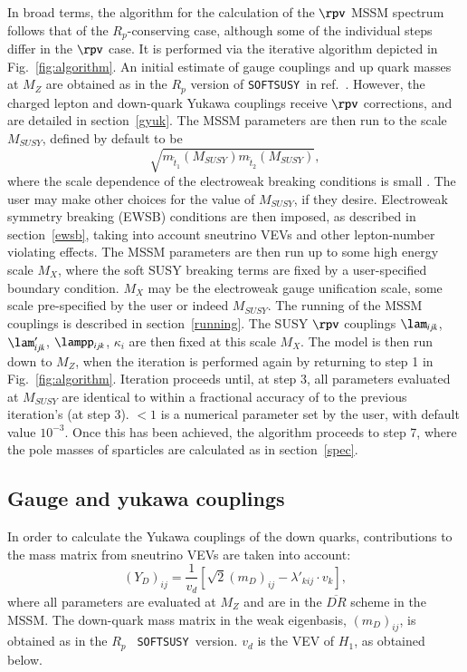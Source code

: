 \documentclass[final,3p,times,pdflatex]{elsarticle}
\begin{document}
In broad terms, the algorithm for the calculation of the $\rpv$ MSSM spectrum
follows that of the $R_p$-conserving case,  although some of the
individual steps differ in the $\rpv$ case. It is performed via the iterative
algorithm depicted in Fig.~\ref{fig:algorithm}.
An initial estimate of
gauge couplings and up quark masses at $M_Z$ are obtained as
in the $R_p$ version of {\tt SOFTSUSY}~in ref.~\cite{Allanach:2001kg}. 
However, the charged lepton and down-quark Yukawa couplings receive $\rpv$
corrections, and are detailed in section~\ref{gyuk}. The MSSM parameters are
then run to the scale $M_{SUSY}$, defined by default to be 
\begin{equation}
\sqrt{m_{\tilde t_1}(M_{SUSY}) m_{\tilde
    t_2}(M_{SUSY})}, \label{msusy} 
\end{equation}
where the scale dependence of the electroweak breaking conditions is
small \cite{Casas:1998cf}. The user may make other choices for the value of
$M_{SUSY}$, if they desire.
Electroweak symmetry breaking (EWSB) conditions are
then imposed, as described in section~\ref{ewsb}, taking into account
sneutrino VEVs and other lepton-number violating effects. The MSSM parameters
are then run up to some high energy scale $M_X$, where the soft SUSY breaking
terms are fixed by a user-specified boundary condition. $M_X$ may be the
electroweak gauge unification scale, some scale pre-specified by the user or
indeed $M_{SUSY}$. The running of the MSSM couplings is described in
section~\ref{running}. 
The SUSY $\rpv$ couplings $\lam_{ijk}$, $\lam'_{ijk}$,
$\lampp_{ijk}$, $\kappa_i$ are then fixed at this scale $M_X$.
The model is then run down to $M_Z$, when the iteration is performed again by
returning to step 1 in Fig.~\ref{fig:algorithm}. Iteration proceeds until, at
step 3, all parameters evaluated at $M_{SUSY}$ are identical to within a fractional
accuracy of  to the previous iteration's (at step 3). 
$<1$ is a numerical parameter set by the user, with default
value $10^{-3}$. 
Once this has been
achieved, the algorithm proceeds to step 7, where the pole masses of
sparticles are calculated as in section~\ref{spec}.

\subsection{Gauge and yukawa couplings \label{gyuk}}

In order to calculate the Yukawa couplings of the down quarks, contributions
to the mass matrix from sneutrino VEVs are taken into 
account:
\begin{equation}
(Y_{D})_{ij} = \frac{1}{v_d}\left[\sqrt{2}(m_D)_{ij} -\lambda'_{kij}\cdot
   {v_k}\right], 
\end{equation}
where all parameters are evaluated at $M_Z$ and are in the $\overline{DR}$
scheme in the MSSM\@. The down-quark mass matrix in the weak eigenbasis,
$(m_D)_{ij}$, is obtained as in the $R_p$ {\tt 
  SOFTSUSY}~version. $v_d$ is the VEV of $H_1$, as obtained below.
\end{document}
